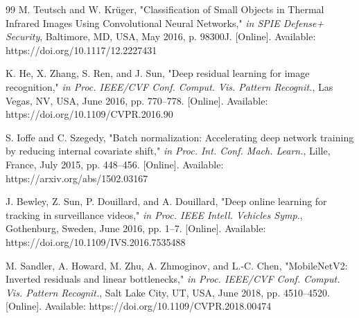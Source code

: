 \documentclass[conference]{IEEEtran}
\begin{document}
\begin{thebibliography}{99}
M. Teutsch and W. Krüger,
"Classification of Small Objects in Thermal Infrared Images Using Convolutional Neural Networks,"
\textit{in SPIE Defense+ Security}, Baltimore, MD, USA, May 2016, p. 98300J.
[Online]. Available: https://doi.org/10.1117/12.2227431

K. He, X. Zhang, S. Ren, and J. Sun,
"Deep residual learning for image recognition,"
\textit{in Proc. IEEE/CVF Conf. Comput. Vis. Pattern Recognit.}, Las Vegas, NV, USA, June 2016, pp. 770--778.
[Online]. Available: https://doi.org/10.1109/CVPR.2016.90

S. Ioffe and C. Szegedy,
"Batch normalization: Accelerating deep network training by reducing internal covariate shift,"
\textit{in Proc. Int. Conf. Mach. Learn.}, Lille, France, July 2015, pp. 448--456.
[Online]. Available: https://arxiv.org/abs/1502.03167

J. Bewley, Z. Sun, P. Douillard, and A. Douillard,
"Deep online learning for tracking in surveillance videos,"
\textit{in Proc. IEEE Intell. Vehicles Symp.}, Gothenburg, Sweden, June 2016, pp. 1--7.
[Online]. Available: https://doi.org/10.1109/IVS.2016.7535488

M. Sandler, A. Howard, M. Zhu, A. Zhmoginov, and L.-C. Chen,
"MobileNetV2: Inverted residuals and linear bottlenecks,"
\textit{in Proc. IEEE/CVF Conf. Comput. Vis. Pattern Recognit.}, Salt Lake City, UT, USA, June 2018, pp. 4510--4520.
[Online]. Available: https://doi.org/10.1109/CVPR.2018.00474

\end{thebibliography}
\end{document}
